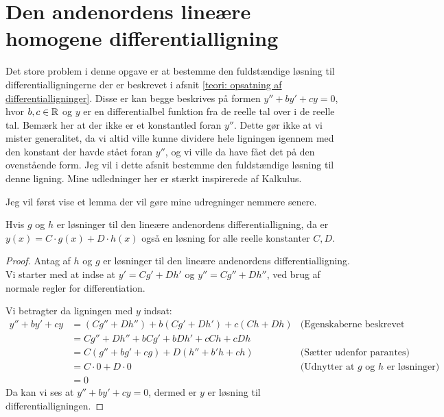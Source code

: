 \section{Den andenordens lineære homogene differentialligning}
Det store problem i denne opgave er at bestemme den fuldstændige løsning til differentialligningerne der er beskrevet i afsnit \ref{teori: opsatning af differentialligninger}.
Disse er kan begge beskrives på formen $y'' + by' + cy = 0$, hvor $b,c \in \mathbb{R}$ og $y$ er en differentialbel funktion fra de reelle tal over i de reelle tal. 
Bemærk her at der ikke er et konstantled foran $y''$. 
Dette gør ikke at vi mister generalitet, da vi altid ville kunne dividere hele ligningen igennem med den konstant der havde stået foran $y''$, og vi ville da have fået det på den ovenstående form. 
Jeg vil i dette afsnit bestemme den fuldstændige løsning til denne ligning. 
Mine udledninger her er stærkt inspirerede af Kalkulus. 

Jeg vil først vise et lemma der vil gøre mine udregninger nemmere senere.

\begin{lemma}\label{thm: Summen af to losninger er en losning}
Hvis $g$ og $h$ er løsninger til den lineære andenordens differentialligning, da er $y(x) = C\cdot g(x) + D \cdot h(x)$ også en løsning for alle reelle konstanter $C,D$. 
\end{lemma}

\begin{proof}
Antag af $h$ og $g$ er løsninger til den lineære andenordens differentialligning. 
Vi starter med at indse at $y'=Cg' + Dh'$ og $y'' = Cg'' + Dh''$, ved brug af normale regler for differentiation. 

Vi betragter da ligningen med $y$ indsat:
\begin{align*}
y'' + by' + cy 	&= (Cg'' + Dh'') + b(Cg' + Dh') + c(Ch + Dh)	& \text{(Egenskaberne beskrevet ovenfor)}\\
				&= Cg'' + Dh'' + bCg' + bDh' + cCh + cDh		\\
				&= C(g'' + bg' + cg) + D(h'' + b'h + ch)		& \text{(Sætter udenfor parantes)}\\
				&= C\cdot 0 + D \cdot 0							& \text{(Udnytter at $g$ og $h$ er løsninger)}\\
				&= 0 
\end{align*}
Da kan vi ses at $y'' + by' + cy = 0$, dermed er $y$ er løsning til differentialligningen.
\end{proof}

